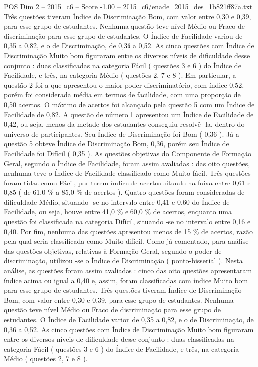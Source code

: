 \begin{textsample}{POS Dim 2 – 2015\_c6 – Score -1.00 – 2015\_c6/enade\_2015\_des\_1b821ff87a.txt}
Três questões tiveram Índice de Discriminação Bom, com valor entre 0,30 e 0,39, para esse grupo de estudantes.
Nenhuma questão teve nível Médio ou Fraco de discriminação para esse grupo de estudantes.
O Índice de Facilidade variou de 0,35 a 0,82, e o de Discriminação, de 0,36 a 0,52.
As cinco questões com Índice de Discriminação Muito bom figuraram entre os diversos níveis de dificuldade desse conjunto : duas classificadas na categoria Fácil ( questões 3 e 6 ) do Índice de Facilidade, e três, na categoria Médio ( questões 2, 7 e 8 ).
Em particular, a questão 2 foi a que apresentou o maior poder discriminatório, com índice 0,52, porém foi considerada média em termos de facilidade, com uma proporção de 0,50 acertos.
O máximo de acertos foi alcançado pela questão 5 com um Índice de Facilidade de 0,82.
A questão de número 1 apresentou um Índice de Facilidade de 0,42, ou seja, menos da metade dos estudantes conseguiu resolvê -la, dentro do universo de participantes.
Seu Índice de Discriminação foi Bom ( 0,36 ).
Já a questão 5 obteve Índice de Discriminação Bom, 0,36, porém seu Índice de Facilidade foi Difícil ( 0,35 ).
As questões objetivas do Componente de Formação Geral, segundo o Índice de Facilidade, foram assim avaliadas : das oito questões, nenhuma teve o Índice de Facilidade classificado como Muito fácil.
Três questões foram tidas como Fácil, por terem índice de acertos situado na faixa entre 0,61 e 0,85 ( de 61,0 \% a 85,0 \% de acertos ).
Quatro questões foram consideradas de dificuldade Médio, situando -se no intervalo entre 0,41 e 0,60 do Índice de Facilidade, ou seja, houve entre 41,0 \% e 60,0 \% de acertos, enquanto uma questão foi classificada na categoria Difícil, situando -se no intervalo entre 0,16 e 0,40.
Por fim, nenhuma das questões apresentou menos de 15 \% de acertos, razão pela qual seria classificada como Muito difícil.
Como já comentado, para análise das questões objetivas, relativas à Formação Geral, segundo o poder de discriminação, utilizou -se o Índice de Discriminação ( ponto-bisserial ).
Nesta análise, as questões foram assim avaliadas : cinco das oito questões apresentaram índice acima ou igual a 0,40 e, assim, foram classificadas com índice Muito bom para esse grupo de estudantes.
Três questões tiveram Índice de Discriminação Bom, com valor entre 0,30 e 0,39, para esse grupo de estudantes.
Nenhuma questão teve nível Médio ou Fraco de discriminação para esse grupo de estudantes.
O Índice de Facilidade variou de 0,35 a 0,82, e o de Discriminação, de 0,36 a 0,52.
As cinco questões com Índice de Discriminação Muito bom figuraram entre os diversos níveis de dificuldade desse conjunto : duas classificadas na categoria Fácil ( questões 3 e 6 ) do Índice de Facilidade, e três, na categoria Médio ( questões 2, 7 e 8 ).

\end{textsample}
